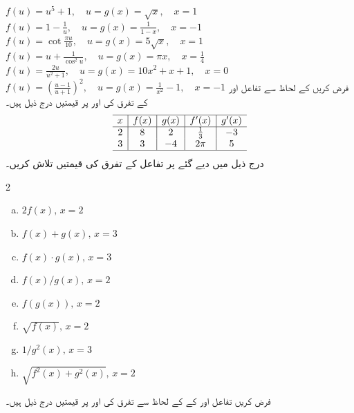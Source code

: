 $f(u)=u^5+1,\quad u=g(x)=\sqrt{x},\quad x=1$
$f(u)=1-\tfrac{1}{u},\quad u=g(x)=\tfrac{1}{1-x},\quad x=-1$
$f(u)=\cot\tfrac{\pi u}{10},\quad u=g(x)=5\sqrt{x},\quad x=1$
$f(u)=u+\tfrac{1}{\cos^2u},\quad u=g(x)=\pi x,\quad x=\tfrac{1}{4}$
$f(u)=\tfrac{2u}{u^2+1},\quad u=g(x)=10x^2+x+1,\quad x=0$
$f(u)=(\tfrac{u-1}{u+1})^2,\quad  u=g(x)=\tfrac{1}{x^2}-1,\quad x=-1$
فرض کریں      کے لحاظ سے تفاعل  اور   کے تفرق کی  اور  پر قیمتیں درج ذیل ہیں۔
\begin{align*}
\begin{array}{c|c|c|c|c}
\hline
x&f(x)&g(x)&f'(x)&g'(x)\\
\hline
2&8&2&\tfrac{1}{3}&-3\\
3&3&-4&2\pi&5\\
\hline
\end{array}
\end{align*}
درج ذیل میں دیے گئے  پر  تفاعل کے تفرق کی قیمتیں  تلاش کریں۔
\begin{multicols}{2}
\begin{enumerate}[a.]

\item
$2f(x),\, x=2$
\item
$f(x)+g(x),\,x=3$
\item
$f(x)\cdot g(x),\, x=3$
\item
$f(x)/g(x),\, x=2$
\item
$f(g(x)),\, x=2$
\item
$\sqrt{f(x)},\, x=2$
\item
$1/g^2(x),\, x=3$
\item
$\sqrt{f^2(x)+g^2(x)},\, x=2$
\end{enumerate}
\end{multicols}
فرض کریں  تفاعل  اور   کے   کے لحاظ سے   تفرق کی  اور  پر قیمتیں درج ذیل ہیں۔
